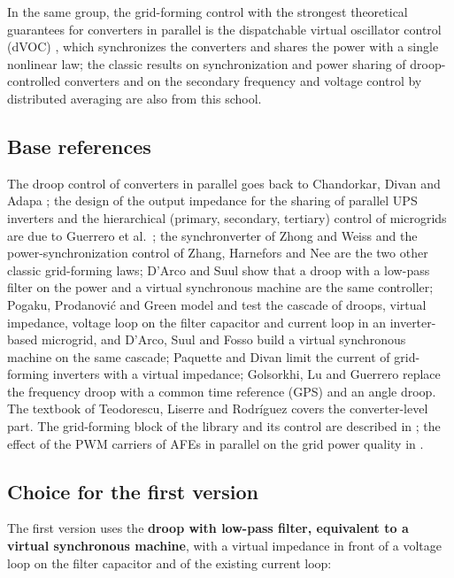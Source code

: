 \documentclass[11pt,a4paper]{scrartcl}
\begin{document}
\begin{onehalfspace}
In the same group, the grid-forming control with the strongest theoretical guarantees for converters in parallel is the dispatchable virtual oscillator control (dVOC) \cite{colombino2019}, which synchronizes the converters and shares the power with a single nonlinear law; the classic results on synchronization and power sharing of droop-controlled converters \cite{simpsonporco2013} and on the secondary frequency and voltage control by distributed averaging \cite{simpsonporco2015} are also from this school.

\subsection{Base references}

The droop control of converters in parallel goes back to Chandorkar, Divan and Adapa \cite{chandorkar1993}; the design of the output impedance for the sharing of parallel UPS inverters and the hierarchical (primary, secondary, tertiary) control of microgrids are due to Guerrero et al.\ \cite{guerrero2005, guerrero2011}; the synchronverter of Zhong and Weiss \cite{zhong2011} and the power-synchronization control of Zhang, Harnefors and Nee \cite{zhang2010} are the two other classic grid-forming laws; D'Arco and Suul \cite{darco2014} show that a droop with a low-pass filter on the power and a virtual synchronous machine are the same controller; Pogaku, Prodanovi\'c and Green \cite{pogaku2007} model and test the cascade of droops, virtual impedance, voltage loop on the filter capacitor and current loop in an inverter-based microgrid, and D'Arco, Suul and Fosso \cite{darco2015} build a virtual synchronous machine on the same cascade; Paquette and Divan \cite{paquette2015} limit the current of grid-forming inverters with a virtual impedance; Golsorkhi, Lu and Guerrero \cite{golsorkhi2017} replace the frequency droop with a common time reference (GPS) and an angle droop. The textbook of Teodorescu, Liserre and Rodr\'iguez \cite{teodorescu2011} covers the converter-level part. The grid-forming block of the library and its control are described in \cite{afe_note, gfm_note}; the effect of the PWM carriers of AFEs in parallel on the grid power quality in \cite{modularity_note}.

\subsection{Choice for the first version}
\label{sec:choice}

The first version uses the \textbf{droop with low-pass filter, equivalent to a virtual synchronous machine}, with a virtual impedance in front of a voltage loop on the filter capacitor and of the existing current loop:


\end{onehalfspace}
\end{document}

